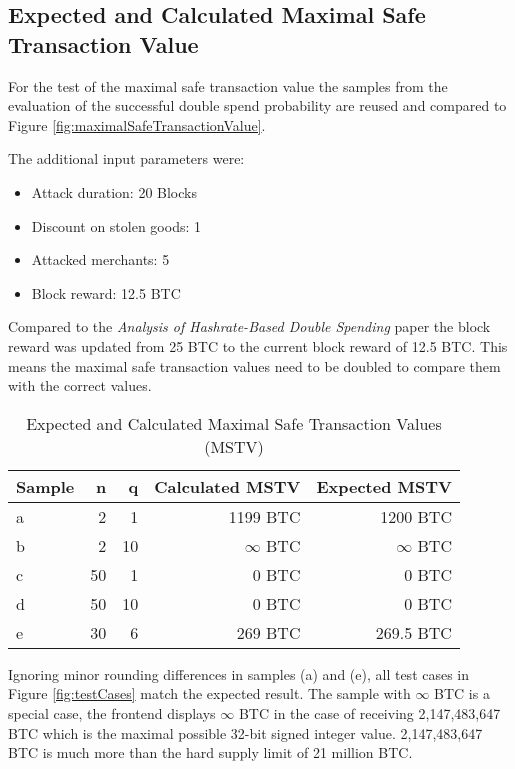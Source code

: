 \subsection{Expected and Calculated Maximal Safe Transaction Value}
For the test of the maximal safe transaction value the samples from the evaluation of the successful double spend probability are reused and compared to Figure \ref{fig:maximalSafeTransactionValue}.

The additional input parameters were:

\begin{itemize}
\item Attack duration: 20 Blocks
\item Discount on stolen goods: 1
\item Attacked merchants: 5
\item Block reward: 12.5 BTC
\end{itemize}

Compared to the \textit{Analysis of Hashrate-Based Double Spending} paper the block reward was updated from 25 BTC to the current block reward of 12.5 BTC. This means the maximal safe transaction values need to be doubled to compare them with the correct values.

\begin{table}[ht]
    \caption{Expected and Calculated Maximal Safe Transaction Values (MSTV)\label{table:doubleSpendingSimulatedAndCalculatedMSTV}}
\centering
\begin{adjustbox}{width=0.65\textwidth}
    \begin{tabular}{| l | r | r | r | r |}
    \hline
    \textbf{Sample} & \textbf{n} & \textbf{q} & \textbf{Calculated MSTV} & \textbf{Expected MSTV} \\ \hline
    a & 2 & 1 & 1199 BTC & 1200 BTC \\ \hline
    b & 2 & 10 & $\infty$ BTC & $\infty$ BTC \\ \hline
    c & 50 & 1 & 0 BTC & 0 BTC \\ \hline
    d & 50 & 10 & 0 BTC & 0 BTC \\ \hline
    e & 30 & 6 & 269 BTC & 269.5 BTC \\ \hline
    \end{tabular}
\end{adjustbox}
\end{table}

Ignoring minor rounding differences in samples (a) and (e), all test cases in Figure \ref{fig:testCases} match the expected result. The sample with $\infty$ BTC is a special case, the frontend displays $\infty$ BTC in the case of receiving 2,147,483,647 BTC which is the maximal possible 32-bit signed integer value. 2,147,483,647 BTC is much more than the hard supply limit of 21 million BTC.

